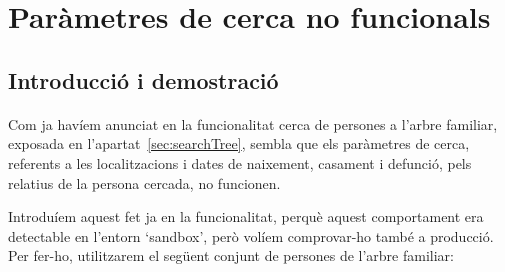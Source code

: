 \section{Paràmetres de cerca no funcionals}

\subsection{Introducció i demostració}

\paragraph{}
Com ja havíem anunciat en la funcionalitat cerca de persones a l'arbre familiar, exposada en l'apartat~\ref{sec:searchTree}, sembla que els paràmetres de cerca, referents a les localitzacions i dates de naixement, casament i defunció, pels relatius de la per\-sona cercada, no funcionen.

Introduíem aquest fet ja en la funcionalitat, perquè aquest comportament era detectable en l'entorn `sandbox', però volíem comprovar-ho també a producció. Per fer-ho, utilitzarem el següent conjunt de persones de l'arbre familiar:


